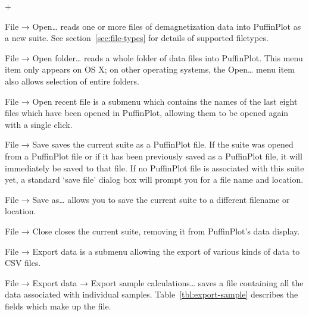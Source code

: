 \documentclass[a4paper,british]{article}
\newcommand{\menuitemlabel}[1]{%
\mbox{\textsf{#1}}\hfil}
\newenvironment{menuitemlist}%
{\begin{list}{}{%
\renewcommand{\makelabel}{\menuitemlabel}%
\setlength{\labelwidth}{35pt}%
\setlength{\leftmargin}%
             {\labelwidth+\labelsep}}}%
{\end{list}}
\newcommand{\ppcmd}[1]{\textsf{#1}} %
\newcommand{\caps}[1]{\MakeTextUppercase{#1}} %
\newcommand{\submenu}{ \textrm{→} }
\begin{document}
\begin{menuitemlist}

\item[File\submenu Open\ldots] reads one or more files of demagnetization
  data into PuffinPlot as a new suite. See
  section~\ref{sec:file-types} for details of supported filetypes.

\item[File\submenu Open folder\ldots] reads a whole folder of data files
  into PuffinPlot. This menu item only appears on OS X; on other
  operating systems, the \ppcmd{Open\ldots} menu item also allows
  selection of entire folders.

\item[File\submenu Open recent file] is a submenu which contains the names of
  the last eight files which have been opened in PuffinPlot, allowing them to
  be opened again with a single click.

\item[File\submenu Save] saves the current suite as a PuffinPlot file. If
the suite was opened from a PuffinPlot file or if it has been previously
saved as a PuffinPlot file, it will immediately be saved to that file. If no %
PuffinPlot file is associated with this suite yet, a standard ‘save file’
dialog box will prompt you for a file name and location.

\item[File\submenu Save as\ldots] allows you to save the current suite to a
different filename or location.

\item[File\submenu Close] closes the current suite, removing it from
PuffinPlot's data display.

\item[File\submenu Export data] is a submenu allowing the export of
various kinds of data to \caps{csv} files.

\item[File\submenu Export data\submenu Export sample calculations\ldots]
  saves a file containing all the data associated with individual samples.
  Table~\ref{tbl:export-sample} describes the fields which make up the file.


\end{menuitemlist}
\end{document}
